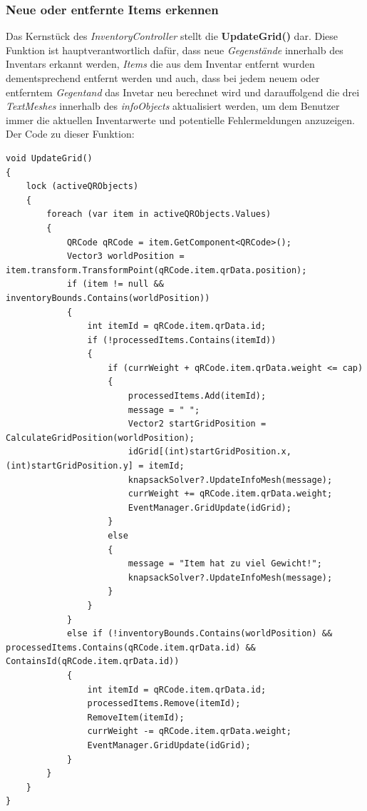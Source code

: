 \subsubsection{Neue oder entfernte Items erkennen}
Das Kernstück des \textit{InventoryController} stellt die \textbf{UpdateGrid()} dar. Diese Funktion ist hauptverantwortlich
dafür, dass neue \textit{Gegenstände} innerhalb des Inventars erkannt werden, \textit{Items} die aus dem Inventar entfernt
wurden dementsprechend entfernt werden und auch, dass bei jedem neuem oder entferntem \textit{Gegentand} das Invetar neu
berechnet wird und darauffolgend die drei \textit{TextMeshes} innerhalb des \textit{infoObjects} aktualisiert werden, um
dem Benutzer immer  die aktuellen Inventarwerte und potentielle Fehlermeldungen anzuzeigen. Der Code zu dieser Funktion:
\begin{lstlisting}[style=csharp, caption={Neue / Entfernte Items erkennen}, label=code:controller_updateGrid]
void UpdateGrid()
{
    lock (activeQRObjects)
    {
        foreach (var item in activeQRObjects.Values)
        {
            QRCode qRCode = item.GetComponent<QRCode>();
            Vector3 worldPosition = item.transform.TransformPoint(qRCode.item.qrData.position);
            if (item != null && inventoryBounds.Contains(worldPosition))
            {
                int itemId = qRCode.item.qrData.id;
                if (!processedItems.Contains(itemId))
                {
                    if (currWeight + qRCode.item.qrData.weight <= cap)
                    {
                        processedItems.Add(itemId);
                        message = " ";
                        Vector2 startGridPosition = CalculateGridPosition(worldPosition);
                        idGrid[(int)startGridPosition.x, (int)startGridPosition.y] = itemId;
                        knapsackSolver?.UpdateInfoMesh(message);
                        currWeight += qRCode.item.qrData.weight;
                        EventManager.GridUpdate(idGrid);
                    }
                    else
                    {
                        message = "Item hat zu viel Gewicht!";
                        knapsackSolver?.UpdateInfoMesh(message);
                    }
                }
            }
            else if (!inventoryBounds.Contains(worldPosition) && processedItems.Contains(qRCode.item.qrData.id) && ContainsId(qRCode.item.qrData.id))
            {
                int itemId = qRCode.item.qrData.id;
                processedItems.Remove(itemId);
                RemoveItem(itemId);
                currWeight -= qRCode.item.qrData.weight;
                EventManager.GridUpdate(idGrid);
            }
        }
    }
}
\end{lstlisting}\\
